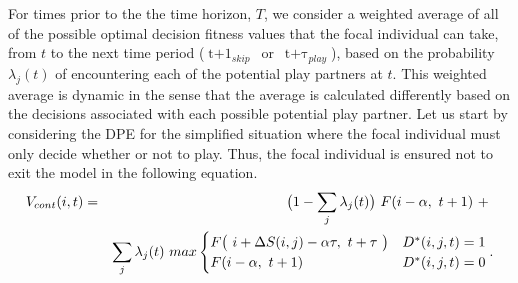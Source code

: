 \documentclass[12pt, letterpaper, fleqn]{article}
\begin{document}
      For times prior to the the time horizon, $T$, we consider a weighted average of all of the possible optimal decision fitness values that the focal individual can take, from $t$ to the next time period \mbox{($\displaystyle\operatorname*{t+1}_{skip}$ or $\displaystyle\operatorname*{t+\tau}_{play}$)}, based on the probability $\lambda_j(t)$  of encountering each of the potential play partners at $t$. %
      This weighted average is dynamic in the sense that the average is calculated differently based on the decisions associated with each possible potential play partner.
      Let us start by considering the DPE for the simplified situation where the focal individual must only decide whether or not to play.
      Thus, the focal individual is ensured not to exit the model in the following equation. %
      \begin{eqnarray}
      \small
      V_{cont}(i,t)&=&\bigl(1-\sum_j \lambda_j(t) \bigr) ~F(i-\alpha,~t+1) ~+~\\
      &&\sum_j \lambda_j(t)~max
      \begin{cases}
	F\bigl(~ i + \Delta S(i,j) - \alpha \tau,~t+\tau ~\bigr)                                & D^*(i,j,t)=1 \\
	F(i-\alpha,~t+1) 				                              & D^*(i,j,t)=0
      \end{cases}.\nonumber     
      \end{eqnarray}
            
\end{document}
